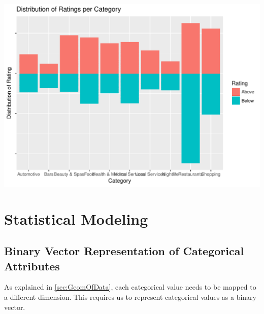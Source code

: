 \documentclass[12pt]{book}\usepackage{knitr}
\begin{document}
\begin{knitrout}
\begin{kframe}
\begin{alltt}
\hlstd{(}\hlstd{)} 
\end{alltt}
\end{kframe}
\includegraphics[width=\maxwidth]{figure/Column_Plot-1} 
\begin{kframe}\begin{alltt}
\end{alltt}
\end{kframe}
\end{knitrout}






\newpage
\section{Statistical Modeling}
\subsection{Binary Vector Representation of Categorical Attributes}
As explained in \ref{sec:GeomOfData}, each categorical value needs to be mapped to a different dimension. This requires us to represent categorical values as a binary vector.\\
\end{document}
